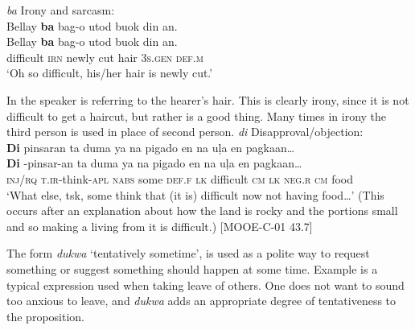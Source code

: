 \ea 
\label{bkm:Ref118730619}
\textit{ba} Irony and sarcasm: \\
Bellay   \textbf{ba}  bag-o  utod  buok  din  an. \\\smallskip
\gll Bellay   \textbf{ba}  bag-o  utod  buok  din  an. \\
difficult  \textsc{irn}  newly  cut  hair  3\textsc{s.gen}  \textsc{def.m} \\
\glt ‘Oh so difficult, his/her hair is newly cut.’ 
\z

In  the speaker is referring to the hearer’s hair. This is clearly irony, since it is not difficult to get a haircut, but rather is a good thing. Many times in irony the third person is used in place of second person.
\ea
\label{bkm:Ref118730658}
\textit{di} Disapproval/objection: \\
\textbf{Di}  pinsaran  ta  duma  ya  na  pigado  en  na  uļa  en  pagkaan… \\\smallskip
\gll \textbf{Di}  \emptyset{}-pinsar-an  ta  duma  ya  na  pigado  en  na  uļa  en  pagkaan… \\
\textsc{inj/rq}  \textsc{t.ir}-think-\textsc{apl}  \textsc{nabs}  some  \textsc{def.f}  \textsc{lk}  difficult  \textsc{cm}  \textsc{lk}  \textsc{neg.r}  \textsc{cm}  food \\
\glt ‘What else, tsk, some think that (it is) difficult now not having food…' (This occurs after an explanation about how the land is rocky and the portions small and so making a living from it is difficult.) [MOOE-C-01 43.7]
\z

The form \textit{dukwa} ‘tentatively sometime’, is used as a polite way to request something or suggest something should happen at some time. Example  is a typical expression used when taking leave of others. One does not want to sound too anxious to leave, and \textit{dukwa} adds an appropriate degree of tentativeness to the proposition.

